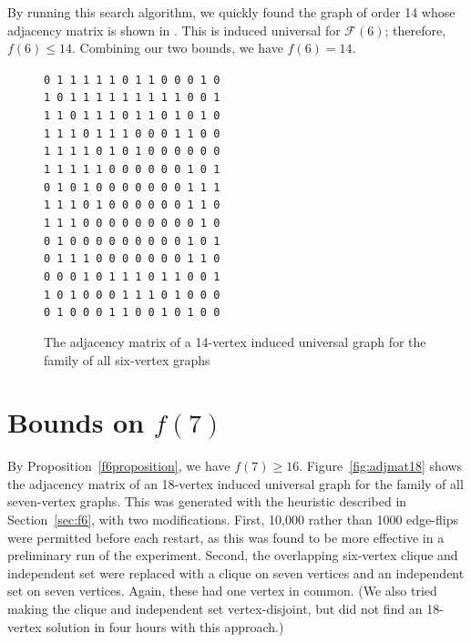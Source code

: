 \documentclass[12pt]{article}
\newcommand{\calF}{\ensuremath{\mathcal{F}}}
\begin{document}
By running this search algorithm, we quickly found the graph of order 14 whose adjacency
matrix is shown in .  This is induced universal for $\calF(6)$;
therefore, $f(6) \leq 14$.  Combining our two bounds, we have $f(6) = 14$.

\begin{figure}[htb]
\centering
\footnotesize
\verb|0 1 1 1 1 1 0 1 1 0 0 0 1 0| \\
\verb|1 0 1 1 1 1 1 1 1 1 1 0 0 1| \\
\verb|1 1 0 1 1 1 0 1 1 0 1 0 1 0| \\
\verb|1 1 1 0 1 1 1 0 0 0 1 1 0 0| \\
\verb|1 1 1 1 0 1 0 1 0 0 0 0 0 0| \\
\verb|1 1 1 1 1 0 0 0 0 0 0 1 0 1| \\
\verb|0 1 0 1 0 0 0 0 0 0 0 1 1 1| \\
\verb|1 1 1 0 1 0 0 0 0 0 0 1 1 0| \\
\verb|1 1 1 0 0 0 0 0 0 0 0 0 1 0| \\
\verb|0 1 0 0 0 0 0 0 0 0 0 1 0 1| \\
\verb|0 1 1 1 0 0 0 0 0 0 0 1 1 0| \\
\verb|0 0 0 1 0 1 1 1 0 1 1 0 0 1| \\
\verb|1 0 1 0 0 0 1 1 1 0 1 0 0 0| \\
\verb|0 1 0 0 0 1 1 0 0 1 0 1 0 0|
\caption{The adjacency matrix of a 14-vertex induced universal graph for the family of all
six-vertex graphs}
\label{fig:adjmat14}
\end{figure}

\section{Bounds on \texorpdfstring{$f(7)$}{f(7)}}\label{sec:f7}

By Proposition~\ref{f6proposition}, we have $f(7) \geq 16$.  Figure~\ref{fig:adjmat18}
shows the adjacency matrix of an 18-vertex induced universal
graph for the family of all seven-vertex graphs. This was generated with 
the heuristic described in Section~\ref{sec:f6}, with two modifications.
First, 10,000 rather than 1000
edge-flips were permitted before each restart, as this was found to be more effective
in a preliminary run of the experiment.  Second, the overlapping six-vertex clique
and independent set were replaced with a clique on seven vertices and an independent
set on seven vertices.  Again, these had one vertex in common.  (We also tried making
the clique and independent set vertex-disjoint, but did not find an 18-vertex solution
in four hours with this approach.)
\end{document}
